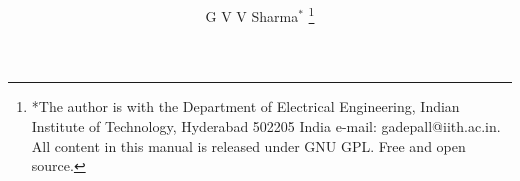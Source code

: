 \documentclass[journal,12pt,twocolumn]{IEEEtran}
\begin{document}
\title{
}
%
%
%

\author{G V V Sharma$^{*}$%
\thanks{*The author is with the Department
of Electrical Engineering, Indian Institute of Technology, Hyderabad
502205 India e-mail:  gadepall@iith.ac.in. All content in this manual is released under GNU GPL.  Free and open source.}%
}
% 
%



% 
\end{document}

